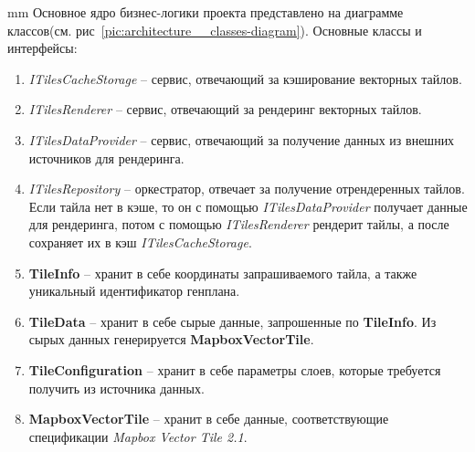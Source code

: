  mm
Основное ядро бизнес-логики проекта представлено на диаграмме классов(см. рис\ \ref{pic:architecture__classes-diagram}).
Основные классы и интерфейсы:
\begin{enumerate}
	\item \textit{ITilesCacheStorage} -- сервис, отвечающий за кэширование векторных тайлов.
	\item \textit{ITilesRenderer} -- сервис, отвечающий за рендеринг векторных тайлов.
	\item \textit{ITilesDataProvider} -- сервис, отвечающий за получение данных из внешних источников для рендеринга.
	\item \textit{ITilesRepository} -- оркестратор, отвечает за получение отрендеренных тайлов.
	Если тайла нет в кэше, то он с помощью \textit{ITilesDataProvider} получает данные для рендеринга, потом
	с помощью \textit{ITilesRenderer} рендерит тайлы, а после сохраняет их в кэш \textit{ITilesCacheStorage}.
	\item \textbf{TileInfo} -- хранит в себе координаты запрашиваемого тайла, а также уникальный идентификатор генплана.
	\item \textbf{TileData} -- хранит в себе сырые данные, запрошенные по \textbf{TileInfo}.
	Из сырых данных генерируется \textbf{MapboxVectorTile}.
	\item \textbf{TileConfiguration} -- хранит в себе параметры слоев, которые требуется получить из источника данных.
	\item \textbf{MapboxVectorTile} -- хранит в себе данные, соответствующие спецификации \textit{Mapbox Vector Tile 2.1}.
\end{enumerate}
